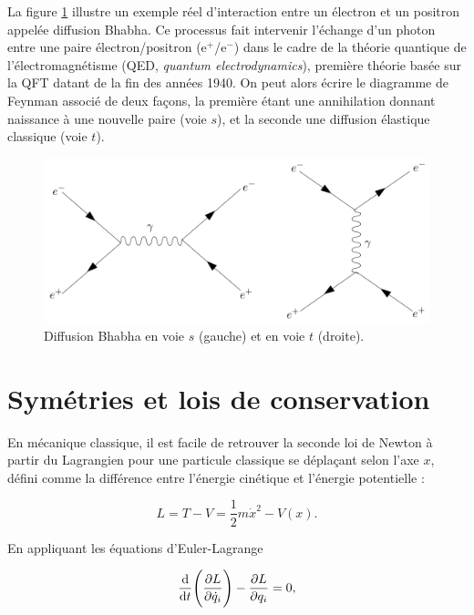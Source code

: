         La figure \ref{bhabha} illustre un exemple réel d'interaction entre un électron et un positron appelée diffusion Bhabha. Ce processus fait intervenir l'échange d'un photon entre une paire électron/positron (e$^+$/e$^-$) dans le cadre de la théorie quantique de l'électromagnétisme (QED, \textit{quantum electrodynamics}), première théorie basée sur la QFT datant de la fin des années 1940. On peut alors écrire le diagramme de Feynman associé de deux façons, la première étant une annihilation donnant naissance à une nouvelle paire (voie $s$), et la seconde une diffusion élastique classique (voie $t$). \\
        
        \begin{figure}
            \centering
            \includegraphics[scale=0.28]{Chapitre1/Images/bhabha.png} 
            \caption{Diffusion Bhabha en voie $s$ (gauche) et en voie $t$ (droite).}
        \label{bhabha}
        \end{figure}
        
        \section{Symétries et lois de conservation}

         En mécanique classique, il est facile de retrouver la seconde loi de Newton à partir du Lagrangien pour une particule classique se déplaçant selon l'axe $x$, défini comme la différence entre l'énergie cinétique et l'énergie potentielle :

        $$L=T-V=\frac{1}{2}m\dot{x}^2-V(x).$$

        En appliquant les équations d'Euler-Lagrange

        \begin{equation}
            \dv{t}\Biggl(\pdv{L}{\dot q_i}\Biggr)-\pdv{L}{q_i} = 0,
        \end{equation}

